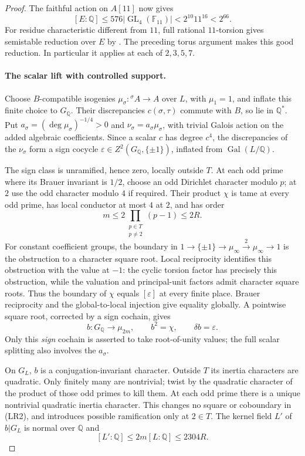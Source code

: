 \begin{proof}
The faithful action on $A[11]$ now gives
\[
 [E:\mathbb Q]\le576|\operatorname{GL}_4(\mathbb F_{11})|
 <2^{10}11^{16}<2^{66}.
\tag{LR1}
\]
For residue characteristic different from $11$, full rational
$11$-torsion gives semistable reduction over $E$ by
\cite[Theorem 3.5, p.~406]{silverbergzarhin}. The preceding torus
argument makes this good reduction. In particular it applies at
each of $2,3,5,7$.

\paragraph{The scalar lift with controlled support.}
Choose $B$-compatible isogenies $\mu_\sigma:{}^\sigma A\to A$ over $L$,
with $\mu_1=1$, and inflate this finite choice to $G_{\mathbb Q}$.
Their discrepancies $c(\sigma,\tau)$ commute with $B$, so lie in
$\mathbb Q^*$. Put $a_\sigma=(\deg\mu_\sigma)^{-1/4}>0$ and
$\nu_\sigma=a_\sigma\mu_\sigma$, with trivial Galois action on the
added algebraic coefficients. Since a scalar $c$ has degree $c^4$,
the discrepancies of the $\nu_\sigma$ form a sign cocycle
$\varepsilon\in Z^2(G_{\mathbb Q},\{\pm1\})$, inflated from
$\operatorname{Gal}(L/\mathbb Q)$.

The sign class is unramified, hence zero, locally outside $T$.
At each odd prime where its Brauer invariant is $1/2$, choose an odd
Dirichlet character modulo $p$; at $2$ use the odd character modulo
$4$ if required. Their product $\chi$ is tame at every odd prime,
has local conductor at most $4$ at $2$, and has order
\[
 m\le2\prod_{\substack{p\in T\\p\ne2}}(p-1)\le2R.
\]
For constant coefficient groups, the boundary in
$1\to\{\pm1\}\to\mu_\infty\xrightarrow{2}\mu_\infty\to1$
is the obstruction to a character square root. Local reciprocity
identifies this obstruction with the value at $-1$: the cyclic
torsion factor has precisely this obstruction, while the valuation
and principal-unit factors admit character square roots.
Thus the boundary of $\chi$ equals $[\varepsilon]$ at every finite
place. Brauer reciprocity and the global-to-local injection give
equality globally. A pointwise square root, corrected by a sign
cochain, gives
\[
 b:G_{\mathbb Q}\longrightarrow\mu_{2m},\qquad
 b^2=\chi,\qquad\delta b=\varepsilon.
\tag{LR2}
\]
Only this \emph{sign} cochain is asserted to take root-of-unity values;
the full scalar splitting also involves the $a_\sigma$.

On $G_L$, $b$ is a conjugation-invariant character. Outside $T$ its
inertia characters are quadratic. Only finitely many are nontrivial;
twist by the quadratic character of the product of those odd primes
to kill them. At each odd prime there is a unique nontrivial quadratic
inertia character. This changes no square or coboundary in (LR2),
and introduces possible ramification only at $2\in T$.
The kernel field $L'$ of $b|G_L$ is normal over $\mathbb Q$ and
\[
 [L':\mathbb Q]\le2m[L:\mathbb Q]\le2304R.
\tag{LR3}
\]


\end{proof}

